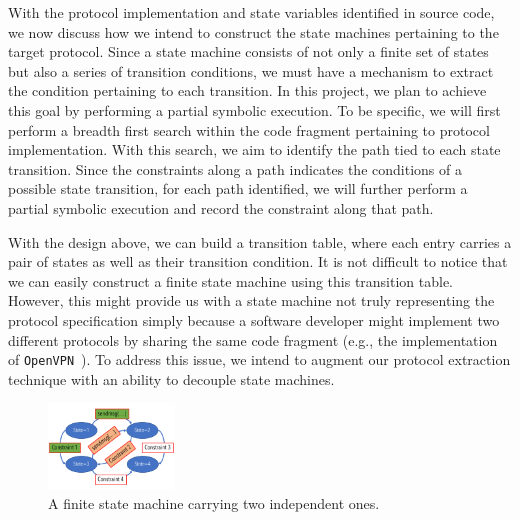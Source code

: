 With the protocol implementation and state variables identified in source code,
we now discuss how we intend to construct the state machines pertaining to the
target protocol. Since a state machine consists of not only a finite set of
states but also a series of transition conditions, we must have a mechanism to
extract the condition pertaining to each transition. In this project, we plan to
achieve this goal by performing a partial symbolic execution. To be specific, we
will first perform a breadth first search within the code fragment pertaining to
protocol implementation. With this search, we aim to identify the path tied to
each state transition. Since the constraints along a path indicates the
conditions of a possible state transition, for each path identified, we will
further perform a partial symbolic execution and record the constraint along
that path.

With the design above, we can build a transition table, where each entry carries
a pair of states as well as their transition condition. It is not difficult to
notice that we can easily construct a finite state machine using this transition
table. However, this might provide us with a state machine not truly
representing the protocol specification simply because a software developer
might implement two different protocols by sharing the same code fragment (e.g.,
the implementation of \texttt{OpenVPN}~\citep{openvpn-github}). To address this
issue, we intend to augment our protocol extraction technique with  an ability
to  decouple  state machines.

\begin{figure}
  \centering
  \includegraphics[width=0.3\textwidth]{figure/fsm0}
  \caption{A finite state machine carrying two independent ones.}
  \label{fig:fsm0}
\end{figure}

